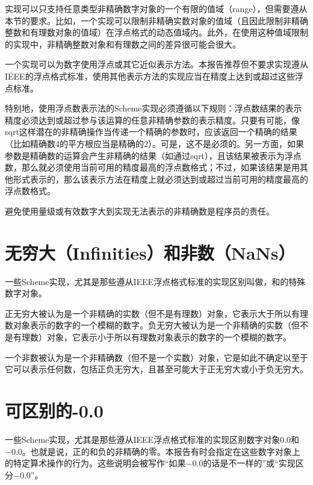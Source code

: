 实现可以只支持任意类型非精确数字对象的一个有限的值域（range），但需要遵从本节的要求。比如，一个实现可以限制非精确实数对象的值域（且因此限制非精确整数和有理数对象的值域）在浮点格式的动态值域内。此外，在使用这种值域限制的实现中，非精确整数对象和有理数之间的差异很可能会很大。

一个实现可以为数字使用浮点或其它近似表示方法。本报告推荐但不要求实现遵从IEEE的浮点格式标准，使用其他表示方法的实现应当在精度上达到或超过这些浮点标准\cite{IEEE}。

特别地，使用浮点数表示法的Scheme实现必须遵循以下规则：浮点数结果的表示精度必须达到或超过参与该运算的任意非精确参数的表示精度。只要有可能，像{\cf sqrt}这样潜在的非精确操作当传递一个精确的参数时，应该返回一个精确的结果（比如精确数4的平方根应当是精确的2）。可是，这不是必须的。另一方面，如果参数是精确数的运算会产生非精确的结果（如通过{\cf sqrt}），且该结果被表示为浮点数，那么就必须使用当前可用的精度最高的浮点数格式；不过，如果该结果是用其他形式表示的，那么该表示方法在精度上就必须达到或超过当前可用的精度最高的浮点数格式。

避免使用量级或有效数字大到实现无法表示的非精确数是程序员的责任。

\section{无穷大（Infinities）和非数（NaNs）}

一些Scheme实现，尤其是那些遵从IEEE浮点格式标准的实现区别叫做，和的特殊数字对象。

正无穷大被认为是一个非精确的实数（但不是有理数）对象，它表示大于所以有理数对象表示的数字的一个模糊的数字。负无穷大被认为是一个非精确的实数（但不是有理数）对象，它表示小于所以有理数对象表示的数字的一个模糊的数字。

一个非数被认为是一个非精确数（但不是一个实数）对象，它是如此不确定以至于它可以表示任何数，包括正负无穷大，且甚至可能大于正无穷大或小于负无穷大。

\section{可区别的-0.0}

一些Scheme实现，尤其是那些遵从IEEE浮点格式标准的实现区别数字对象$0.0$和$-0.0$。也就是说，正的和负的非精确的零。本报告有时会指定在这些数字对象上的特定算术操作的行为。这些说明会被写作“如果$-0.0$的话是不一样的”或“实现区分$-0.0$”。

